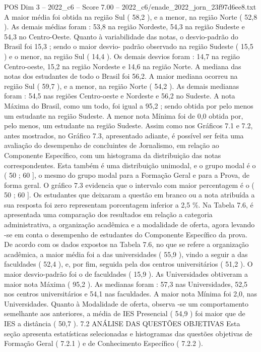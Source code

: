 \begin{textsample}{POS Dim 3 – 2022\_c6 – Score 7.00 – 2022\_c6/enade\_2022\_jorn\_23f97d6ee8.txt}
A maior média foi obtida na região Sul ( 58,2 ), e a menor, na região Norte ( 52,8 ).
As demais médias foram : 53,8 na região Nordeste, 54,3 na região Sudeste e 54,3 no Centro-Oeste.
Quanto à variabilidade das notas, o desvio-padrão do Brasil foi 15,3 ; sendo o maior desvio- padrão observado na região Sudeste ( 15,5 ) e o menor, na região Sul ( 14,4 ).
Os demais desvios foram : 14,7 na região Centro-oeste, 15,2 na região Nordeste e 14,6 na região Norte.
A mediana das notas dos estudantes de todo o Brasil foi 56,2.
A maior mediana ocorreu na região Sul ( 59,7 ), e a menor, na região Norte ( 54,2 ).
As demais medianas foram : 54,5 nas regiões Centro-oeste e Nordeste e 56,2 no Sudeste.
A nota Máxima do Brasil, como um todo, foi igual a 95,2 ; sendo obtida por pelo menos um estudante na região Sudeste.
A menor nota Mínima foi de 0,0 obtida por, pelo menos, um estudante na região Sudeste.
Assim como nos Gráficos 7.1 e 7.2, antes mostrados, no Gráfico 7.3, apresentado adiante, é possível ser feita uma avaliação do desempenho de concluintes de Jornalismo, em relação ao Componente Específico, com um histograma da distribuição das notas correspondentes.
Esta também é uma distribuição unimodal, e o grupo modal é o ( 50 ; 60 ], o mesmo do grupo modal para a Formação Geral e para a Prova, de forma geral.
O gráfico 7.3 evidencia que o intervalo com maior percentagem é o ( 50 ; 60 ].
Os estudantes que deixaram a questão em branco ou a nota atribuída a sua resposta foi zero representam porcentagem inferior a 2,5 \%.
Na Tabela 7.6, é apresentada uma comparação dos resultados em relação a categoria administrativa, a organização acadêmica e a modalidade de oferta, agora levando -se em conta o desempenho de estudantes do Componente Específico da prova.
De acordo com os dados expostos na Tabela 7.6, no que se refere a organização acadêmica, a maior média foi a das universidades ( 55,9 ), vindo a seguir a das faculdades ( 52,4 ), e, por fim, seguida pela dos centros universitários ( 51,2 ).
O maior desvio-padrão foi o de faculdades ( 15,9 ).
As Universidades obtiveram a maior nota Máxima ( 95,2 ).
As medianas foram : 57,3 nas Universidades, 52,5 nos centros universitários e 54,1 nas faculdades.
A maior nota Mínima foi 2,0, nas Universidades.
Quanto à Modalidade de oferta, observa -se um comportamento semelhante aos anteriores, a média de IES Presencial ( 54,9 ) foi maior que de IES a distância ( 50,7 ). 7.2 ANÁLISE DAS QUESTÕES OBJETIVAS Esta seção apresenta estatísticas selecionadas e histogramas das questões objetivas de Formação Geral ( 7.2.1 ) e de Conhecimento Específico ( 7.2.2 ).

\end{textsample}
